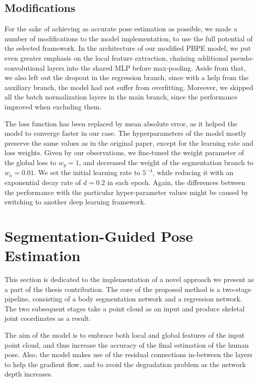 \subsection{Modifications}
For the sake of achieving as accurate pose estimation as possible, we made a number of modifications to the model implementation, to use the full potential of the selected framework. In the architecture of our modified PBPE model, we put even greater emphasis on the local feature extraction, chaining additional pseudo-convolutional layers into the shared MLP before max-pooling. Aside from that, we also left out the dropout in the regression branch, since with a help from the auxiliary branch, the model had not suffer from overfitting. Moreover, we skipped all the batch normalization layers in the main branch, since the performance improved when excluding them.\par
\vspace{5mm}
\noindent
The loss function has been replaced by mean absolute error, as it helped the model to converge faster in our case. The hyperparameters of the model mostly preserve the same values as in the original paper, except for the learning rate and loss weights. Given by our observations, we fine-tuned the weight parameter of the global loss to $w_g=1$, and decreased the weight of the segmentation branch to $w_a = 0.01$. We set the initial learning rate to $5^{-4}$, while reducing it with an exponential decay rate of $d = 0.2$ in each epoch. Again, the differences between the performance with the particular hyper-parameter values might be caused by switching to another deep learning framework. 


\section{Segmentation-Guided Pose Estimation} %

This section is dedicated to the implementation of a novel approach we present as a part of the thesis contribution. The core of the proposed method is a two-stage pipeline, consisting of a body segmentation network and a regression network. The two subsequent stages take a point cloud as an input and produce skeletal joint coordinates as a result.\par
\vspace{5mm}
\noindent The aim of the model is to embrace both local and global features of the input point cloud, and thus increase the accuracy of the final estimation of the human pose. Also, the model makes use of the residual connections in-between the layers to help the gradient flow, and to avoid the degradation problem as the network depth increases.


